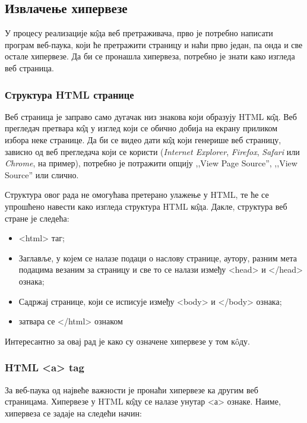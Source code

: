 \subsection{Извлачење хипервезе}

У процесу реализације к\^{о}да веб претраживача, прво је потребно написати програм веб-паука, који ће претражити страницу и наћи прво један, па онда и све остале хипервезе. Да би се пронашла хипервеза, потребно је знати како изгледа веб страница.

\subsubsection{Структура HTML странице}
Веб страница је заправо само дугачак низ знакова који образују HTML к\^{о}д. Веб прегледач претвара к\^{о}д у изглед који се обично добија на екрану приликом избора неке странице. Да би се видео дати к\^{о}д који генерише веб страницу,  зависно од веб прегледача који се користи (\emph{Internet Explorer}, \emph{Firefox}, \emph{Safari} или \emph{Chrome}, на пример), потребно је потражити опцију ,,View Page Source'', ,,View Source'' или слично.

Структура овог рада не омогућава претерано улажење у HTML, те ће се упрошћено навести како изгледа структура HTML к\^{о}да\cite{strukturaHTML}. Дакле, структура веб стране је следећа:

\begin{itemize}
\item <html> таг;
\item Заглавље, у којем се налазе подаци о наслову странице, аутору, разним  мета подацима везаним за страницу и све то се налази између <head> и </head> ознака;
\item Садржај странице, који се исписује између <body> и </body> ознака;
\item затвара се </html> ознаком
\end{itemize}

Интересантно за овај рад је како су означене хипервезе у том к\^{o}ду.

\subsubsection{HTML <a> tag}
За веб-паука од највеће важности је пронаћи хипервезе ка другим  веб страницама. Хипервезе у HTML к\^{о}ду се налазе унутар <а> ознаке. Наиме, хипервеза се задаје на следећи начин:

